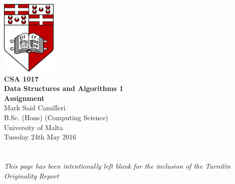 \documentclass[12pt,a4paper,onesided]{report}
\begin{document}
	\begin{titlepage}
		\vspace*{\fill}
		\centering
		\includegraphics[width=0.2\textwidth]{University_of_Malta_Logo}\\
		\vspace*{3em}
		\textbf{\LARGE CSA 1017\\\vspace{0.1em}Data Structures and Algorithms 1}\\
		\vspace*{0.75em}
		\textbf{\Large Assignment}\\
		\vspace{3em}
		\large Mark Said Camilleri\\
			B.Sc. (Hons) (Computing Science)\\
			University of Malta\\
		\vspace*{1em}
		Tuesday 24th May 2016
		\vfill
	\end{titlepage}
	\pagebreak
	\tableofcontents

\chapter*{}
\vspace{15em}
\begin{center}
\emph{This page has been intentionally left blank for the inclusion of \newline the Turnitin Originality Report} 
\end{center}
\vfill
\end{document}
